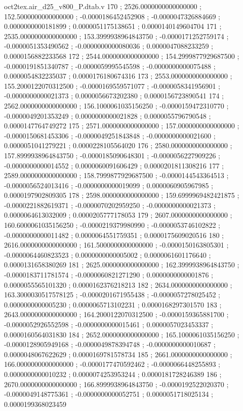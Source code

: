 \begin{filecontents}[overwrite]{oct2tex.air_d25_v800_P.dtab.v}
170 ; 2526.0000000000000000 ; 152.5000000000000000 ; -0.0000186452452908 ; -0.0000047326884669 ; 0.0000000000181899 ; 0.0000051175138651 ; 0.0000140149604704
171 ; 2535.0000000000000000 ; 153.3999938964843750 ; -0.0000171252759174 ; -0.0000051353490562 ; -0.0000000000080036 ; 0.0000047088233259 ; 0.0000156882233568
172 ; 2544.0000000000000000 ; 154.2999877929687500 ; -0.0000191851340787 ; -0.0000059995545598 ; -0.0000000000075488 ; 0.0000054832235037 ; 0.0000176180674316
173 ; 2553.0000000000000000 ; 155.2000122070312500 ; -0.0000169559571077 ; -0.0000058341956901 ; -0.0000000000021373 ; 0.0000056673202380 ; 0.0000156723890541
174 ; 2562.0000000000000000 ; 156.1000061035156250 ; -0.0000159472310770 ; -0.0000049201353249 ; 0.0000000000021828 ; 0.0000055796790548 ; 0.0000147764749272
175 ; 2571.0000000000000000 ; 157.0000000000000000 ; -0.0000150681453306 ; -0.0000049251843848 ; -0.0000000000021600 ; 0.0000051041279221 ; 0.0000228105564020
176 ; 2580.0000000000000000 ; 157.8999938964843750 ; -0.0000185090648301 ; -0.0000056227909226 ; -0.0000000000014552 ; 0.0000060091606429 ; 0.0000201811308216
177 ; 2589.0000000000000000 ; 158.7999877929687500 ; -0.0000144543364513 ; -0.0000056524013416 ; -0.0000000000019099 ; 0.0000060905967985 ; 0.0000197902809305
178 ; 2598.0000000000000000 ; 159.6999969482421875 ; -0.0000221882619371 ; -0.0000070202959250 ; -0.0000000000021373 ; 0.0000064613032009 ; 0.0000205777178053
179 ; 2607.0000000000000000 ; 160.6000061035156250 ; -0.0000219379980990 ; -0.0000053746102822 ; -0.0000000000011482 ; 0.0000064551759351 ; 0.0000175609020516
180 ; 2616.0000000000000000 ; 161.5000000000000000 ; -0.0000150163805301 ; -0.0000064460823523 ; 0.0000000000005002 ; 0.0000061601176640 ; 0.0000131658380269
181 ; 2625.0000000000000000 ; 162.3999938964843750 ; -0.0000183711781574 ; -0.0000060821271290 ; 0.0000000000001876 ; 0.0000055565101320 ; 0.0000162376218213
182 ; 2634.0000000000000000 ; 163.3000030517578125 ; -0.0000201671955438 ; -0.0000057278025452 ; 0.0000000000005230 ; 0.0000065713102231 ; 0.0000168297301570
183 ; 2643.0000000000000000 ; 164.2000122070312500 ; -0.0000159365881700 ; -0.0000052926552598 ; -0.0000000000015461 ; 0.0000057023453337 ; 0.0000160564031830
184 ; 2652.0000000000000000 ; 165.1000061035156250 ; -0.0000128905949168 ; -0.0000049878394748 ; -0.0000000000010687 ; 0.0000048067622629 ; 0.0000169781578734
185 ; 2661.0000000000000000 ; 166.0000000000000000 ; -0.0000177470592462 ; -0.0000066448255893 ; 0.0000000000010232 ; 0.0000074253953244 ; 0.0000181728246389
186 ; 2670.0000000000000000 ; 166.8999938964843750 ; -0.0000192522020370 ; -0.0000049148775361 ; -0.0000000000052751 ; 0.0000051718025134 ; 0.0000199368023459

\end{filecontents}
